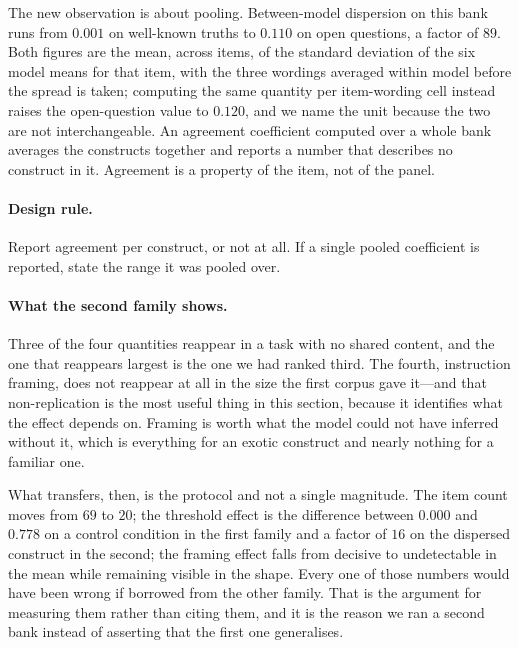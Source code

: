The new observation is about pooling. Between-model dispersion on this bank runs from $0.001$ on
well-known truths to $0.110$ on open questions, a factor of $89$. Both figures are the mean,
across items, of the standard deviation of the six model means for that item, with the three
wordings averaged within model before the spread is taken; computing the same quantity per
item-wording cell instead raises the open-question value to $0.120$, and we name the unit
because the two are not interchangeable. An agreement coefficient computed over a whole bank
averages the constructs together and reports a number that describes no construct in it.
Agreement is a property of the item, not of the panel.

\paragraph{Design rule.} Report agreement per construct, or not at all. If a single pooled
coefficient is reported, state the range it was pooled over.

\paragraph{What the second family shows.} Three of the four quantities reappear in a task with no
shared content, and the one that reappears largest is the one we had ranked third. The fourth,
instruction framing, does not reappear at all in the size the first corpus gave it---and that
non-replication is the most useful thing in this section, because it identifies what the effect
depends on. Framing is worth what the model could not have inferred without it, which is
everything for an exotic construct and nearly nothing for a familiar one.

What transfers, then, is the protocol and not a single magnitude. The item count moves from $69$
to $20$; the threshold effect is the difference between $0.000$ and $0.778$ on a control
condition in the first family and a factor of $16$ on the dispersed construct in the second; the
framing effect
falls from decisive to undetectable in the mean while remaining visible in the shape. Every one of
those numbers would have been wrong if borrowed from the other family. That is the argument for
measuring them rather than citing them, and it is the reason we ran a second bank instead of
asserting that the first one generalises.
